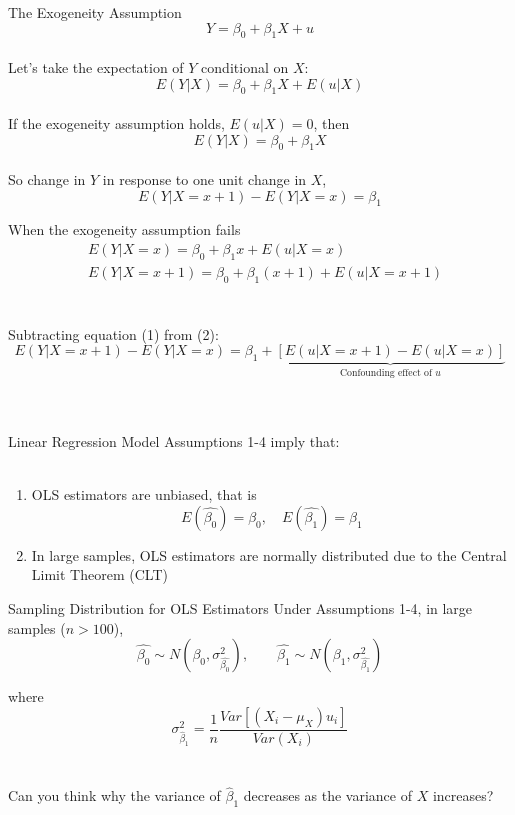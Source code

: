 \documentclass{./../div_teaching_slides}
\begin{document}
\begin{frame}{The Exogeneity Assumption}
\vspace{-1em}
$$ Y = \beta_0 + \beta_1 X + u $$ \\ \vspace{0.5em}
Let's take the expectation of $Y$ conditional on $X$: 
$$ E(Y | X) = \beta_0 + \beta_1 X + E(u|X) $$ \\ \vspace{0.5em}
If the exogeneity assumption holds, $E(u|X)=0$, then
$$ E(Y | X) = \beta_0 + \beta_1 X  $$ \\ \vspace{0.5em}
So change in $Y$ in response to one unit change in $X$, $$  E(Y | X=x+1)  -  E(Y | X=x) =  \beta_1 $$
\end{frame}



\begin{frame}{When the exogeneity assumption fails}
\vspace{-1.5em}
\begin{align}
	 & E(Y|X=x) = \beta_0 + \beta_1 x + E(u|X=x) \\ 
	 & E(Y|X=x+1) = \beta_0 + \beta_1 (x+1) + E(u|X=x+1) 
\end{align} \\~\\
Subtracting equation (1) from (2):
$$ E(Y|X=x+1)-E(Y|X=x) = \beta_1 + \underbrace{[E(u|X=x+1)-E(u|X=x)]}_{\text{Confounding effect of $u$}} $$ \\~\\
\end{frame}

\begin{frame}{Linear Regression Model}
Assumptions 1-4 imply that: \\~\\
\begin{enumerate}
  \item OLS estimators are unbiased, that is
$$ E(\hat{\beta_0}) = \beta_0, \quad  E(\hat{\beta_1}) = \beta_1 $$ 
\item In large samples, OLS estimators are normally distributed due to the Central Limit Theorem (CLT)
\end{enumerate}
\end{frame}
  
\begin{frame}{Sampling Distribution for OLS Estimators}
Under Assumptions 1-4, in large samples ($n>100$), 
 $$ \hat{\beta_0} \sim N(\beta_0, \sigma^2_{\hat{\beta_0}}), \quad \quad  \hat{\beta_1} \sim N(\beta_1, \sigma^2_{\hat{\beta_1}}) $$
 
 where $$ \sigma^2_{\hat{\beta}_1} = \frac{1}{n} \frac{Var[(X_i-\mu_X)u_i]}{Var(X_i)} $$	\pause \\~\\

 Can you think why the variance of $\hat{\beta}_1$ decreases as the variance of $X$ increases?
\end{frame}
\end{document}
